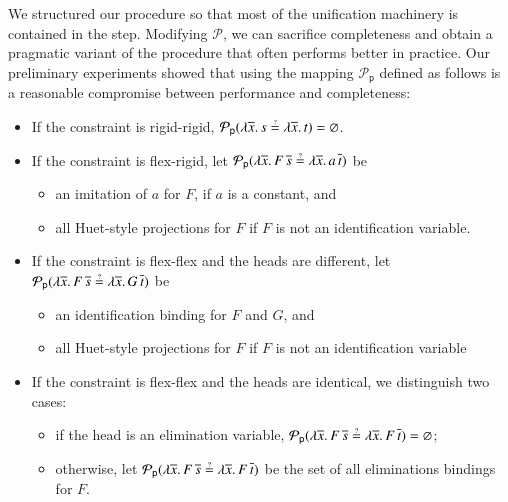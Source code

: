  We structured our procedure so that most of
the unification machinery is contained in the  step. Modifying
$\mathcal{P}$, we can sacrifice completeness and obtain a pragmatic variant of
the procedure that often performs better in practice. 
Our preliminary experiments showed that using the mapping $\mathcal{P}_\mathsf{p}$ defined as follows is a reasonable compromise between performance and
completeness:
\begin{itemize}
    \setlength\itemsep{1\jot}
    \item If the constraint is rigid-rigid, $\mathcal{P}_\mathsf{p}(\lambda \overline{x}.
    \, s \unif \lambda \overline{x}. \, t) = \varnothing$.
    \item If the constraint is flex-rigid,
    let 
    $\mathcal{P}_\mathsf{p}(\lambda \overline{x}. \, F \,\overline{s} \unif \lambda \overline{x}. \, a\, \overline{t})$ 
    be 
    \begin{itemize}
        \item an imitation of $a$ for $F$, if $a$ is a constant, and
        \item all Huet-style projections for $F$ if $F$ is not an identification variable.
    \end{itemize}
    
    \item If the constraint is flex-flex and the heads are different,
    let 
    $\mathcal{P}_\mathsf{p}(\lambda \overline{x}. \, F \,\overline{s} \unif \lambda \overline{x}. \, G\, \overline{t})$ 
    be
    \begin{itemize}
      \item an identification binding for $F$ and $G$, and
      \item all Huet-style projections for $F$ if $F$ is not an identification variable
  \end{itemize}
   
  \item If the constraint is flex-flex and the heads are identical, we distinguish two cases:
      \begin{itemize}
      \item if the head is an elimination variable, 
      $\mathcal{P}_\mathsf{p}(\lambda \overline{x}. \, F \,\overline{s} \unif \lambda \overline{x}. \, F\, \overline{t}) = \varnothing$;
      \item otherwise, let $\mathcal{P}_\mathsf{p}(\lambda \overline{x}. \, F \,\overline{s} \unif \lambda \overline{x}. \, F\, \overline{t})$
            be the set of all eliminations bindings for $F$. 
  \end{itemize}
\end{itemize}

